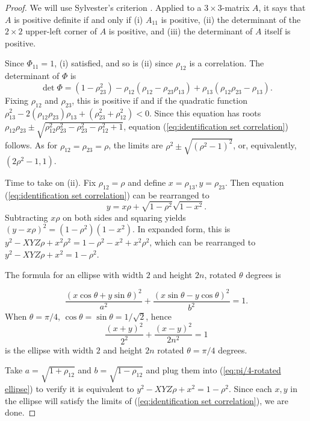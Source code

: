 \begin{proof}
We will use Sylvester's criterion \parencite{Gilbert1991-ch}. Applied
to a $3\times3$-matrix $A$, it says that $A$ is positive definite
if and only if (i) $A_{11}$ is positive, (ii) the determinant of
the $2\times2$ upper-left corner of $A$ is positive, and (iii) the
determinant of $A$ itself is positive. 

Since $\Phi_{11}=1$, (i) satisfied, and so is (ii) since $\rho_{12}$
is a correlation. The determinant of $\Phi$ is
\begin{equation*}
\det\Phi = (1-\rho_{23}^{2})-\rho_{12}(\rho_{12}-\rho_{23}\rho_{13})+\rho_{13}(\rho_{12}\rho_{23}-\rho_{13}).
\end{equation*}
Fixing $\rho_{12}$ and $\rho_{23}$, this is positive if and if the
quadratic function $\rho_{13}^{2}-2(\rho_{12}\rho_{23})\rho_{13}+(\rho_{23}^{2}+\rho_{12}^{2})<0$.
Since this equation has roots $\rho_{12}\rho_{23}\pm\sqrt{\rho_{12}^{2}\rho_{23}^{2}-\rho_{23}^{2}-\rho_{12}^{2}+1}$,
equation (\ref{eq:identification set correlation}) follows. As for
$\rho_{12}=\rho_{23}=\rho$, the limits are $\rho^{2}\pm\sqrt{(\rho^{2}-1)^{2}}$,
or, equivalently, $(2\rho^{2}-1,1).$

Time to take on (ii). Fix $\rho_{12}=\rho$ and define $x=\rho_{13},y=\rho_{23}$.
Then equation (\ref{eq:identification set correlation}) can be rearranged
to
\begin{equation}
y=x\rho+\sqrt{1-\rho^{2}}\sqrt{1-x^{2}}.\label{eq:ellipse eq1}
\end{equation}
Subtracting $x\rho$ on both sides and squaring yields $(y-x\rho)^{2}=(1-\rho^{2})(1-x^{2}).$
In expanded form, this is $y^{2}-XYZ\rho+x^{2}\rho^{2}=1-\rho^{2}-x^{2}+x^{2}\rho^{2}$,
which can be rearranged to $y^{2}-XYZ\rho+x^{2}=1-\rho^{2}$. 

The formula for an ellipse with width $2$ and height $2n$, rotated
$\theta$ degrees is

\[
\frac{(x\cos\theta+y\sin\theta)^{2}}{a^{2}}+\frac{(x\sin\theta-y\cos\theta)^{2}}{b^{2}}=1.
\]
When $\theta=\pi/4$, $\cos\theta=\sin\theta=1/\sqrt{2}$, hence 
\begin{equation}
\frac{(x+y)^{2}}{2^{2}}+\frac{(x-y)^{2}}{2n^{2}}=1\label{eq:pi/4-rotated ellipse}
\end{equation}
is the ellipse with width $2$ and height $2n$ rotated $\theta=\pi/4$
degrees.

Take $a=\sqrt{1+\rho_{12}}$ and $b=\sqrt{1-\rho_{12}}$ and plug
them into (\ref{eq:pi/4-rotated ellipse}) to verify it is equivalent
to $y^{2}-XYZ\rho+x^{2}=1-\rho^{2}$. Since each $x,y$ in the ellipse
will satisfy the limits of (\ref{eq:identification set correlation}),
we are done.
\end{proof}
